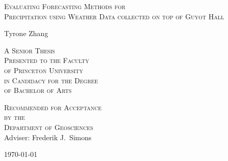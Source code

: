 \thispagestyle{empty}
  \begin{center}
    \textsc{\LARGE Evaluating Forecasting Methods for\\ Precipitation using Weather Data collected on top of Guyot Hall } %
  \end{center}
  \vspace{.6in}
  \begin{center}
      Tyrone Zhang
  \end{center}
  \vspace{.6in}
  \begin{center}
    \textsc{A Senior Thesis \\ %
    Presented to the Faculty \\
    of Princeton University \\
    in Candidacy for the Degree \\
    of Bachelor of Arts}
  \end{center}
  \vspace{.3in}
  \begin{center}
    \textsc{Recommended for Acceptance \\
    by the \\Department of  Geosciences \\}
    Adviser: Frederik J.~Simons
  \end{center}
  \vspace{.3in}
  \begin{center}
  \today
  \end{center}
  
  \clearpage
